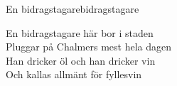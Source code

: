 \begin{song}{En bidragstagare}{bidragstagare}
\begin{vers}
En bidragstagare här bor i staden\\
Pluggar på Chalmers mest hela dagen\\
Han dricker öl och han dricker vin\\
Och kallas allmänt för fyllesvin\\
\end{vers}
\end{song}